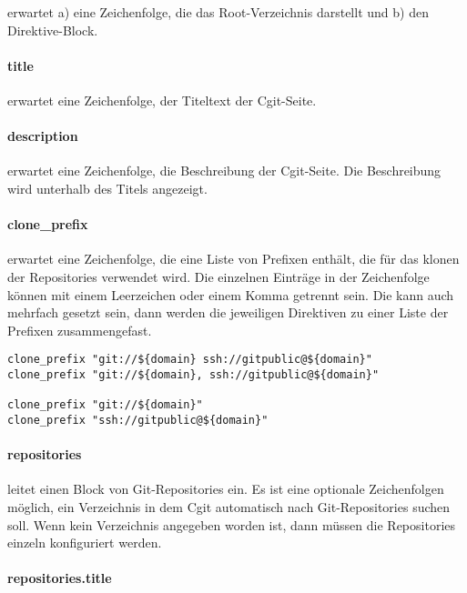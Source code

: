  erwartet a) eine Zeichenfolge, die das Root-Verzeichnis
darstellt und b) den Direktive-Block.

\paragraph{title}

 erwartet eine Zeichenfolge, der Titeltext der Cgit-Seite.

\paragraph{description}

 erwartet eine Zeichenfolge, die Beschreibung der
Cgit-Seite. Die Beschreibung wird unterhalb des Titels angezeigt.

\paragraph{clone\_prefix}

 erwartet eine Zeichenfolge, die eine Liste von
Prefixen enthält, die für das klonen der Repositories verwendet wird. Die
einzelnen Einträge in der Zeichenfolge können mit einem Leerzeichen oder einem
Komma getrennt sein. Die  kann auch mehrfach gesetzt
sein, dann werden die jeweiligen Direktiven zu einer Liste der Prefixen
zusammengefast.

\begin{lstlisting}[style=Java, caption=Beispiele für die
\directive{clone\_prefix}]
clone_prefix "git://${domain} ssh://gitpublic@${domain}"
clone_prefix "git://${domain}, ssh://gitpublic@${domain}"

clone_prefix "git://${domain}"
clone_prefix "ssh://gitpublic@${domain}"
\end{lstlisting}

\paragraph{repositories}

 leitet einen Block von Git-Repositories ein. Es ist
eine optionale Zeichenfolgen möglich, ein Verzeichnis in dem Cgit automatisch
nach Git-Repositories suchen soll. Wenn kein Verzeichnis angegeben worden ist,
dann müssen die Repositories einzeln konfiguriert werden.

\paragraph{repositories.title}

